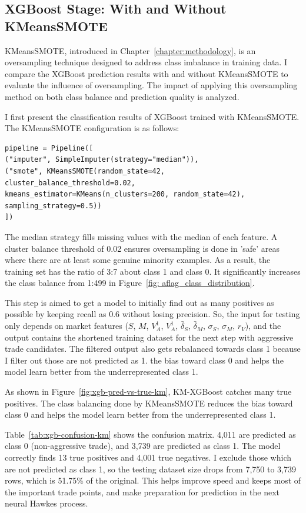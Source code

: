 \subsection{XGBoost Stage: With and Without KMeansSMOTE}

KMeansSMOTE, introduced in Chapter~\ref{chapter:methodology}, is an oversampling technique designed to address class imbalance in training data. I compare the XGBoost prediction results with and without KMeansSMOTE to evaluate the influence of oversampling. The impact of applying this oversampling method on both class balance and prediction quality is analyzed.

I first present the classification results of XGBoost trained with KMeansSMOTE. The KMeansSMOTE configuration is as follows:

\begin{verbatim}
pipeline = Pipeline([
("imputer", SimpleImputer(strategy="median")),
("smote", KMeansSMOTE(random_state=42,
cluster_balance_threshold=0.02,
kmeans_estimator=KMeans(n_clusters=200, random_state=42),
sampling_strategy=0.5))
])
\end{verbatim}

The median strategy fills missing values with the median of each feature. A cluster balance threshold of 0.02 ensures oversampling is done in 'safe' areas where there are at least some genuine minority examples. As a result, the training set has the ratio of 3:7 about class 1 and class 0. It significantly increases the class balance from 1:499 in Figure~\ref{fig: aflag_class_distribution}.

This step is aimed to get a model to initially find out as many positives as possible by keeping recall as 0.6 without losing precision. So, the input for testing only depends on market features ($S$, $M$, $V_A^{1}$, $V_A^{1}$, $\bar{\delta}_S$, $\bar{\delta}_M$, $\sigma_S$, $\sigma_M$, $r_V$), and the output contains the shortened training dataset for the next step with aggressive trade candidates. The filtered output also gets rebalanced towards class 1 because I filter out those are not predicted as 1. the bias toward class 0 and helps the model learn better from the underrepresented class 1.

As shown in Figure~\ref{fig:xgb-pred-vs-true-km}, KM-XGBoost catches many true positives. The class balancing done by KMeansSMOTE reduces the bias toward class 0 and helps the model learn better from the underrepresented class 1.

Table~\ref{tab:xgb-confusion-km} shows the confusion matrix. 4,011 are predicted as class 0 (non-aggressive trade), and 3,739 are predicted as class 1. The model correctly finds 13 true positives and 4,001 true negatives. I exclude those which are not predicted as class 1, so the testing dataset size drops from 7,750 to 3,739 rows, which is 51.75\% of the original. This helps improve speed and keeps most of the important trade points, and make preparation for prediction in the next neural Hawkes process.

